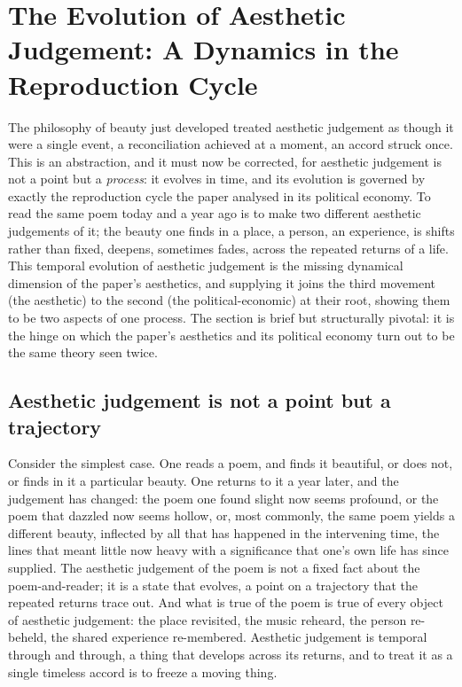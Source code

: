 \section{The Evolution of Aesthetic Judgement: A Dynamics in the Reproduction Cycle}
\label{p21:sec:evolution}

\noindent
The philosophy of beauty just developed treated aesthetic judgement as though it were a single event, a reconciliation achieved at a moment, an accord struck once. This is an abstraction, and it must now be corrected, for aesthetic judgement is not a point but a \emph{process}: it evolves in time, and its evolution is governed by exactly the reproduction cycle the paper analysed in its political economy. To read the same poem today and a year ago is to make two different aesthetic judgements of it; the beauty one finds in a place, a person, an experience, is shifts rather than fixed, deepens, sometimes fades, across the repeated returns of a life. This temporal evolution of aesthetic judgement is the missing dynamical dimension of the paper's aesthetics, and supplying it joins the third movement (the aesthetic) to the second (the political-economic) at their root, showing them to be two aspects of one process. The section is brief but structurally pivotal: it is the hinge on which the paper's aesthetics and its political economy turn out to be the same theory seen twice.

\subsection{Aesthetic judgement is not a point but a trajectory}
\label{p21:sub:ev-trajectory}

Consider the simplest case. One reads a poem, and finds it beautiful, or does not, or finds in it a particular beauty. One returns to it a year later, and the judgement has changed: the poem one found slight now seems profound, or the poem that dazzled now seems hollow, or, most commonly, the same poem yields a different beauty, inflected by all that has happened in the intervening time, the lines that meant little now heavy with a significance that one's own life has since supplied. The aesthetic judgement of the poem is not a fixed fact about the poem-and-reader; it is a state that evolves, a point on a trajectory that the repeated returns trace out. And what is true of the poem is true of every object of aesthetic judgement: the place revisited, the music reheard, the person re-beheld, the shared experience re-membered. Aesthetic judgement is temporal through and through, a thing that develops across its returns, and to treat it as a single timeless accord is to freeze a moving thing.

